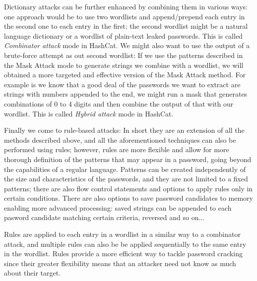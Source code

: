 Dictionary attacks can be further enhanced by combining them in various ways: one approach would be to use two wordlists and append/prepend each entry in the second one to each entry in the first; 
the second wordlist might be a natural language dictionary or a wordlist of plain-text leaked passwords. This is called \emph{Combinator attack} mode in HashCat. 
We might also want to use the output of a brute-force attempt as out second wordlist: If we use the patterns described in the Mask Attack mode to generate strings we combine with a wordlist, we will obtained a more targeted and effective version of the Mask Attack method. 
For example is we know that a good deal of the passwords we want to extract are strings with numbers appended to the end, we might run a mask that generates combinations of 0 to 4 digits and then combine the output of that with our wordlist. This is called \emph{Hybrid attack } mode in HashCat.

Finally we come to rule-based attacks: In short they are an extension of all the methods described above, and all the aforementioned techniques can also be performed using rules; however, rules are more flexible and allow for more thorough definition of the patterns that may appear in a password, going beyond the capabilities of a regular language.
Patterns can be created independently of the size and characteristics of the passwords, and they are not limited to a fixed patterns; there are also flow control statements and options to apply rules only in certain conditions.
There are also options to save password candidates to memory enabling more advanced processing: saved strings can be appended to each pasword candidate matching certain criteria, reversed and so on...

Rules are applied to each entry in a wordlist in a similar way to a combinator attack, and multiple rules can also be be applied sequentially to the same entry in the wordlist.
Rules provide a more efficient way to tackle password cracking since their greater flexibility means that an attacker need not know as much about their target. 


